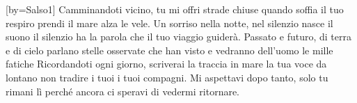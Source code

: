 [by={Salso1}]
\beginverse
Camminandoti vicino, tu mi offri strade chiuse
quando soffia il tuo respiro
prendi il mare alza le vele.
Un sorriso nella notte, nel silenzio nasce il suono
il silenzio ha la parola
che il tuo viaggio guiderà.
\endverse
\beginchorus
Passato e futuro, di terra e di cielo
parlano stelle osservate
che han visto e vedranno dell'uomo
le mille fatiche
\endchorus
\beginverse
Ricordandoti ogni giorno, scriverai la traccia in mare
la tua voce da lontano
non tradire i tuoi i tuoi compagni.
Mi aspettavi dopo tanto, solo tu rimani lì
perché ancora ci speravi
di vedermi ritornare.
\endverse
\endsong
